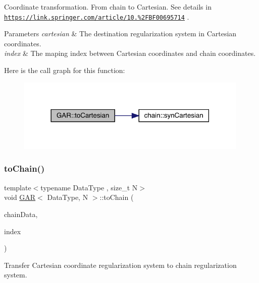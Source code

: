 Coordinate transformation. From chain to Cartesian. See details in \href{https://link.springer.com/article/10.1007%2FBF00695714}{\tt https\+://link.\+springer.\+com/article/10.\%2\+F\+B\+F00695714} . 
\begin{DoxyParams}{Parameters}
{\em cartesian} & The destination regularization system in Cartesian coordinates. \\
\hline
{\em index} & The maping index between Cartesian coordinates and chain coordinates. \\
\hline
\end{DoxyParams}
Here is the call graph for this function\+:\nopagebreak
\begin{figure}[H]
\begin{center}
\leavevmode
\includegraphics[width=314pt]{class_g_a_r_a2a282218e90ffb1a367da364b70e54a3_cgraph}
\end{center}
\end{figure}
\mbox{\label{class_g_a_r_a18041ac48dc47e6ada3e8a33893b1200}} 
\subsubsection{\texorpdfstring{to\+Chain()}{toChain()}}
{\footnotesize\ttfamily template$<$typename Data\+Type , size\+\_\+t N$>$ \\
void \mbox{\hyperlink{class_g_a_r}{G\+AR}}$<$ Data\+Type, N $>$\+::to\+Chain (\begin{DoxyParamCaption}\item[{\mbox{\hyperlink{class_g_a_r}{G\+AR}}$<$ Data\+Type, N $>$ \&}]{chain\+Data,  }\item[{\mbox{\hyperlink{class_g_a_r_aaf033049c0cd8f0f86a82b9595086fa5}{Index\+Array}} \&}]{index }\end{DoxyParamCaption})\hspace{0.3cm}{\ttfamily [inline]}}



Transfer Cartesian coordinate regularization system to chain regularization system. 

